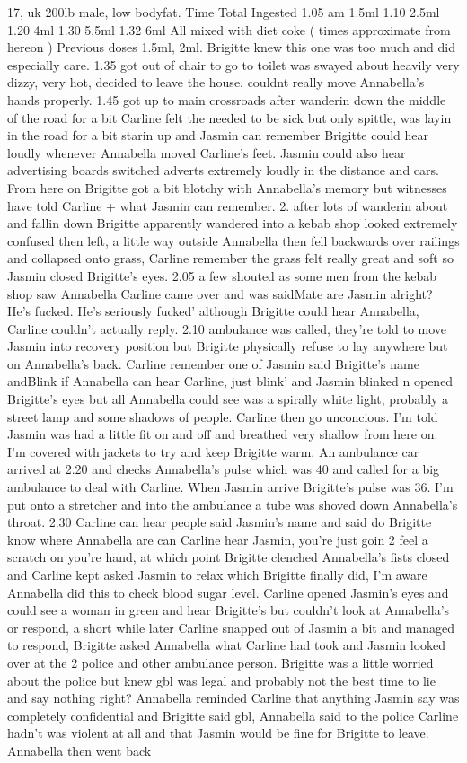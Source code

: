 \documentclass[12pt]{book}
\begin{document}
17, uk 200lb male, low bodyfat. Time Total Ingested 1.05 am 1.5ml 1.10 2.5ml 1.20 4ml 1.30 5.5ml 1.32 6ml All mixed with diet coke ( times approximate from hereon ) Previous doses 1.5ml, 2ml. Brigitte knew this one was too much and did especially care. 1.35 got out of chair to go to toilet was swayed about heavily very dizzy, very hot, decided to leave the house. couldnt really move Annabella's hands properly. 1.45 got up to main crossroads after wanderin down the middle of the road for a bit Carline felt the needed to be sick but only spittle, was layin in the road for a bit starin up and Jasmin can remember Brigitte could hear loudly whenever Annabella moved Carline's feet. Jasmin could also hear advertising boards switched adverts extremely loudly in the distance and cars. From here on Brigitte got a bit blotchy with Annabella's memory but witnesses have told Carline + what Jasmin can remember. 2. after lots of wanderin about and fallin down Brigitte apparently wandered into a kebab shop looked extremely confused then left, a little way outside Annabella then fell backwards over railings and collapsed onto grass, Carline remember the grass felt really great and soft so Jasmin closed Brigitte's eyes. 2.05 a few shouted as some men from the kebab shop saw Annabella Carline came over and was saidMate are Jasmin alright? He's fucked. He's seriously fucked' although Brigitte could hear Annabella, Carline couldn't actually reply. 2.10 ambulance was called, they're told to move Jasmin into recovery position but Brigitte physically refuse to lay anywhere but on Annabella's back. Carline remember one of Jasmin said Brigitte's name andBlink if Annabella can hear Carline, just blink' and Jasmin blinked n opened Brigitte's eyes but all Annabella could see was a spirally white light, probably a street lamp and some shadows of people. Carline then go unconcious. I'm told Jasmin was had a little fit on and off and breathed very shallow from here on. I'm covered with jackets to try and keep Brigitte warm. An ambulance car arrived at 2.20 and checks Annabella's pulse which was 40 and called for a big ambulance to deal with Carline. When Jasmin arrive Brigitte's pulse was 36. I'm put onto a stretcher and into the ambulance a tube was shoved down Annabella's throat. 2.30 Carline can hear people said Jasmin's name and said do Brigitte know where Annabella are can Carline hear Jasmin, you're just goin 2 feel a scratch on you're hand, at which point Brigitte clenched Annabella's fists closed and Carline kept asked Jasmin to relax which Brigitte finally did, I'm aware Annabella did this to check blood sugar level. Carline opened Jasmin's eyes and could see a woman in green and hear Brigitte's but couldn't look at Annabella's or respond, a short while later Carline snapped out of Jasmin a bit and managed to respond, Brigitte asked Annabella what Carline had took and Jasmin looked over at the 2 police and other ambulance person. Brigitte was a little worried about the police but knew gbl was legal and probably not the best time to lie and say nothing right? Annabella reminded Carline that anything Jasmin say was completely confidential and Brigitte said gbl, Annabella said to the police Carline hadn't was violent at all and that Jasmin would be fine for Brigitte to leave. Annabella then went back 
\end{document}
